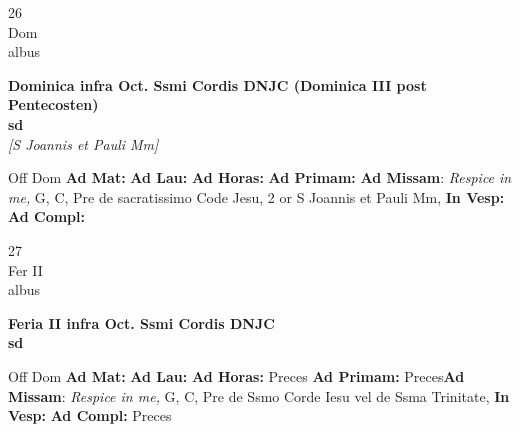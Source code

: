 \documentclass[10pt, openany]{book}
\begin{document}
        \begin{center}
            \begin{minipage}{3.5in}
                \vspace{2em}
                \begin{minipage}{0.5in}
                    {\Huge 26} \\
                    {\normalsize Dom} \\
                    {\normalsize albus}
                \end{minipage}
                \begin{minipage}{3.0in}
                    \textbf{ \large Dominica infra Oct. Ssmi Cordis DNJC (Dominica III post Pentecosten) \\
                    \textnormal{\normalsize sd}} \\ \textit{[S Joannis et Pauli Mm]} \\ 
                \end{minipage}
                \begin{justify}Off Dom
                    \textbf{Ad Mat: }
                    \textbf{Ad Lau: }
                    \textbf{Ad Horas: }
                    \textbf{Ad Primam: }\textbf{Ad Missam}: \textit{Respice in me,} G, C, Pre de sacratissimo Code Jesu, 2 or S Joannis et Pauli Mm,  
                    \textbf{In Vesp: }
                    \textbf{Ad Compl: }
                \end{justify}
            \end{minipage}
        \end{center}
    
        \begin{center}
            \begin{minipage}{3.5in}
                \vspace{2em}
                \begin{minipage}{0.5in}
                    {\Huge 27} \\
                    {\normalsize Fer II} \\
                    {\normalsize albus}
                \end{minipage}
                \begin{minipage}{3.0in}
                    \textbf{ \large Feria II infra Oct. Ssmi Cordis DNJC \\
                    \textnormal{\normalsize sd}} \\ 
                \end{minipage}
                \begin{justify}Off Dom
                    \textbf{Ad Mat: }
                    \textbf{Ad Lau: }
                    \textbf{Ad Horas: }Preces
                    \textbf{Ad Primam: }Preces\textbf{Ad Missam}: \textit{Respice in me,} G, C, Pre de Ssmo Corde Iesu vel de Ssma Trinitate,  
                    \textbf{In Vesp: }
                    \textbf{Ad Compl: }Preces
                \end{justify}
            \end{minipage}
        \end{center}
    
\end{document}
